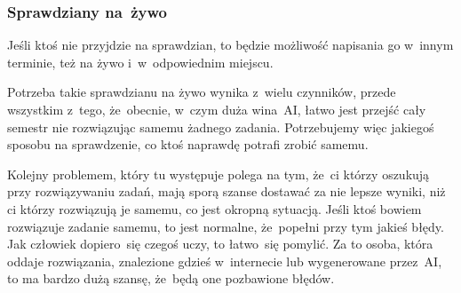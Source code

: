 \documentclass[10pt,t]{beamer}
\begin{document}
\begin{frame}
  \frametitle{Sprawdziany na~żywo}


  Jeśli ktoś nie przyjdzie na sprawdzian, to będzie możliwość napisania
  go w~innym terminie, też na żywo i~w~odpowiednim miejscu.

  Potrzeba takie sprawdzianu na żywo wynika z~wielu czynników, przede
  wszystkim z~tego, że~obecnie, w~czym duża wina~AI, łatwo jest przejść
  cały semestr nie rozwiązując samemu żadnego zadania. Potrzebujemy więc
  jakiegoś sposobu na sprawdzenie, co ktoś naprawdę potrafi zrobić samemu.

  Kolejny problemem, który tu występuje polega na tym, że~ci którzy
  oszukują przy rozwiązywaniu zadań, mają sporą szanse dostawać za nie
  lepsze wyniki, niż ci którzy rozwiązują je samemu, co jest okropną
  sytuacją. Jeśli ktoś bowiem rozwiązuje zadanie samemu, to jest normalne,
  że~popełni przy tym jakieś błędy. Jak człowiek dopiero~się czegoś uczy,
  to łatwo~się pomylić. Za to osoba, która oddaje rozwiązania,
  znalezione gdzieś w~internecie lub wygenerowane przez~AI, to ma bardzo
  dużą szansę, że~będą one pozbawione błędów.



\end{frame}
\end{document}
